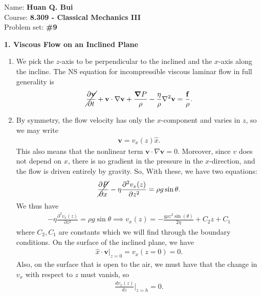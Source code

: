 \documentclass{article}
\theoremstyle{definition}
\newcommand{\p}{\partial}
\newcommand{\f}[2]{\frac{#1}{#2}}
\begin{document}
	
\begin{framed}
	\noindent Name: \textbf{Huan Q. Bui}\\
	Course: \textbf{8.309 - Classical Mechanics III}\\
	Problem set: \textbf{\#9}
\end{framed}


\noindent \textbf{1. Viscous Flow on an Inclined Plane}

\begin{enumerate}[label=(\alph*)]
	\item We pick the $z$-axis to be perpendicular to the inclined and the $x$-axis along the incline. The NS equation for incompressible viscous laminar flow in full generality is 
	\begin{align*}
	\cancel{\f{\p \mathbf{v}}{\p t}}+ \mathbf{v}\cdot \nabla \mathbf{v} + \f{\grad P}{\rho} - \f{\eta}{\rho} \laplacian \mathbf{v} = \f{\mathbf{f}}{\rho}.
	\end{align*}
	
	
	
	\item 
	By symmetry, the flow velocity has only the $x$-component and varies in $z$, so we may write
	\begin{align*}
	\mathbf{v} = v_x(z) \hat{x}.
	\end{align*}
	This also means that the nonlinear term $\mathbf{v} \cdot \nabla \mathbf{v} =0$. Moreover, since $v$ does not depend on $x$, there is no gradient in the pressure in the $x$-direction, and the flow is driven entirely by gravity. So, 
	With these, we have two equations:
	\begin{align*}
	\cancel{\f{\p P}{\p x}}- \eta \f{\p^2 v_x(z)}{\p z^2} = \rho g \sin \theta .
	\end{align*}
	We thus have
	\begin{align*}
	- \eta \f{\p^2 v_x(z)}{\p z^2} = \rho g \sin\theta \implies v_x(z) = -\frac{g \rho  z^2 \sin (\theta )}{2 \eta }+C_2 z+C_1
	\end{align*}  
	where $C_2, C_1$ are constants which we will find through the boundary conditions. On the surface of the inclined plane, we have
	\begin{align*}
	\hat x \cdot \mathbf{v}\big\vert_{z=0} = v_x(z=0) = 0.
	\end{align*}
	Also, on the surface that is open to the air, we must have that the change in $v_x$ with respect to $z$ must vanish, so
	\begin{align*}
	\f{d v_x(z)}{dz}\bigg\vert_{z=h} = 0.
	\end{align*}
	

\end{enumerate}
\end{document}
